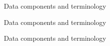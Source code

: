 \begin{frame}{Data components and terminology}
\end{frame}

\begin{frame}{Data components and terminology}
\end{frame}

\begin{frame}{Data components and terminology}
\end{frame}

